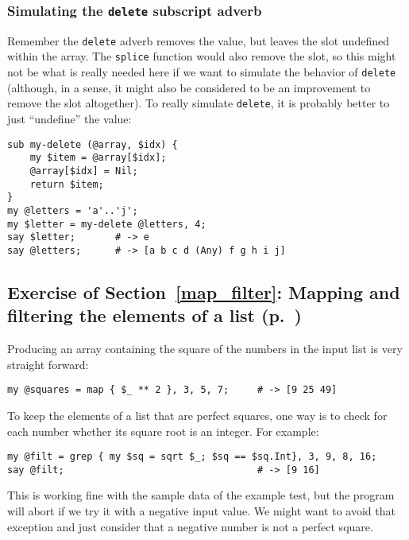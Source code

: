 \subsubsection{Simulating the {\tt delete} subscript adverb}

Remember the {\tt delete} adverb removes the value, but 
leaves the slot undefined within the array. The {\tt splice} 
function would also remove the slot, so this might not be 
what is really needed here if we want to simulate the 
behavior of {\tt delete} (although, in a sense, it might 
also be considered to be an improvement to remove the slot
altogether). To really simulate {\tt delete}, it is probably 
better to just ``undefine'' the value:

\begin{verbatim}
sub my-delete (@array, $idx) {
    my $item = @array[$idx];
    @array[$idx] = Nil;
    return $item;
}
my @letters = 'a'..'j';
my $letter = my-delete @letters, 4;
say $letter;       # -> e
say @letters;      # -> [a b c d (Any) f g h i j]
\end{verbatim}

\subsection{Exercise of Section~\ref{map_filter}: Mapping and filtering the elements of a list (p.~\pageref{exercise_squares})}
\label{sol_exercise_squares}

Producing an array containing the square of the numbers in the input list is very straight forward:

\begin{verbatim}
my @squares = map { $_ ** 2 }, 3, 5, 7;     # -> [9 25 49]
\end{verbatim}
%

To keep the elements of a list that are perfect squares, one 
way is to check for each number whether its square root 
is an integer. For example:

\begin{verbatim}
my @filt = grep { my $sq = sqrt $_; $sq == $sq.Int}, 3, 9, 8, 16;
say @filt;                                  # -> [9 16]
\end{verbatim}
%

This is working fine with the sample data of the example test, 
but the program will abort if we try it with a negative input 
value. We might want to avoid that exception and just 
consider that a negative number is not a perfect square.

